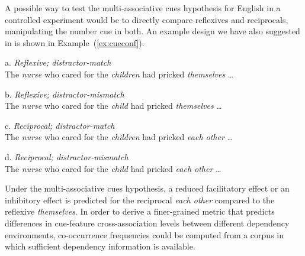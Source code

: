 \documentclass{cambridge7A}\usepackage[]{graphicx}\usepackage[]{color}
\begin{document}
A possible way to test the multi-associative cues hypothesis for English in a controlled experiment would be to directly compare reflexives and reciprocals, manipulating the number cue in both.
An example design we have also suggested in \cite{JaegerEngelmannVasishth2015} is shown in Example~(\ref{ex:cueconf}).

\begin{exe}
\ex\label{ex:cueconf}
\begin{xlist}
\item  [a.] \textit{Reflexive; distractor-match}\\
The \textit{nurse} who cared for the \textit{children} had pricked \textit{themselves} \dots
\item  [b.] \textit{Reflexive; distractor-mismatch}\\
The \textit{nurse} who cared for the \textit{child} had pricked \textit{themselves} \dots
\item  [c.] \textit{Reciprocal; distractor-match}\\
The \textit{nurse} who cared for the \textit{children} had pricked \textit{each other} \dots
\item  [d.] \textit{Reciprocal; distractor-mismatch}\\
The \textit{nurse} who cared for the \textit{child} had pricked \textit{each other} \dots
\end{xlist}
\end{exe}  

Under the multi-associative cues hypothesis, a reduced facilitatory effect or an inhibitory effect is predicted for the reciprocal \textit{each other} compared to the reflexive \textit{themselves}. In order to derive a finer-grained metric that predicts differences in cue-feature cross-association levels between different dependency environments, co-occurrence frequencies could be computed from a corpus in which sufficient dependency information is available.
\end{document}
